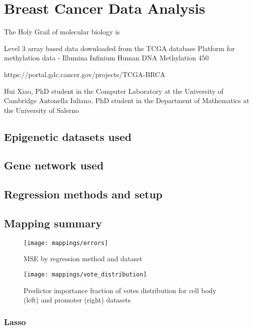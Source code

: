 \chapter{Breast Cancer Data Analysis}

The Holy Grail of molecular biology is \cite{setubal1997introduction}

Level 3 array based data downloaded from the TCGA database
Platform for methylation data - Illumina Infinium Human DNA Methylation 450

https://portal.gdc.cancer.gov/projects/TCGA-BRCA

Hui Xiao, PhD student in the Computer Laboratory at the University of Cambridge
Antonella Iuliano, PhD student in the Department of Mathematics at the University of Salerno

\section{Epigenetic datasets used}

\section{Gene network used}

\section{Regression methods and setup}

\section{Mapping summary}

\pagebreak

\begin{figure}[H]
	\centering
	\texttt{[image: mappings/errors]}
	\caption{MSE by regression method and dataset}
	\label{fig:map_errors}
\end{figure}

\pagebreak

\begin{figure}[H]
	\centering
	\texttt{[image: mappings/vote\_distribution]}
	\caption{Predictor importance fraction of votes distribution for cell body (left) and promoter (right) datasets}
	\label{fig:map_vote_dist}
\end{figure}


\pagebreak
\subsection{Lasso}

